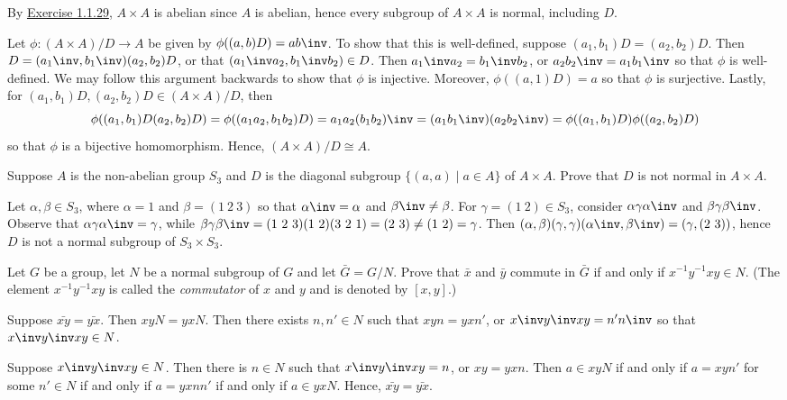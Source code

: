 \begin{sol}
    By \hyperref[ex1.1.29]{Exercise 1.1.29}, $A \times A$ is abelian since $A$ is abelian, hence every subgroup of $A \times A$ is normal, including $D$.

    Let $\phi : (A \times A)/D \to A$ be given by $\phi((a, b)D) = ab\inv$. To show that this is well-defined, suppose $(a_1, b_1)D = (a_2, b_2)D$. Then $D = (a_1\inv, b_1\inv)(a_2, b_2)D$, or that $(a_1\inv a_2, b_1\inv b_2) \in D$. Then $a_1\inv a_2 = b_1\inv b_2$, or $a_2b_2\inv = a_1b_1\inv$ so that $\phi$ is well-defined. We may follow this argument backwards to show that $\phi$ is injective. Moreover, $\phi((a, 1)D) = a$ so that $\phi$ is surjective. Lastly, for $(a_1, b_1)D, (a_2, b_2)D \in (A \times A)/D$, then
    \[\phi((a_1, b_1)D (a_2, b_2)D) = \phi((a_1a_2, b_1b_2)D) = a_1a_2(b_1b_2)\inv = (a_1b_1\inv)(a_2b_2\inv) = \phi((a_1, b_1)D)\phi((a_2, b_2)D)\]
    so that $\phi$ is a bijective homomorphism. Hence, $(A \times A)/D \cong A$.
\end{sol}

\begin{exercise}\label{ex3.1.39}
    Suppose $A$ is the non-abelian group $S_3$ and $D$ is the diagonal subgroup $\{(a,a) \mid a \in A\}$ of $A \times A$. Prove that $D$ is not normal in $A \times A$.
\end{exercise}

\begin{sol}
    Let $\alpha, \beta \in S_3$, where $\alpha = 1$ and $\beta = (1\ 2\ 3)$ so that $\alpha\inv = \alpha$ and $\beta\inv \neq \beta$. For $\gamma = (1\ 2) \in S_3$, consider $\alpha\gamma\alpha\inv$ and $\beta\gamma\beta\inv$. Observe that $\alpha\gamma\alpha\inv = \gamma$, while $\beta\gamma\beta\inv = (1\ 2\ 3)(1\ 2)(3\ 2\ 1) = (2\ 3) \neq (1\ 2) = \gamma$. Then $(\alpha, \beta)(\gamma, \gamma)(\alpha\inv, \beta\inv) = (\gamma, (2\ 3))$, hence $D$ is not a normal subgroup of $S_3 \times S_3$.
\end{sol}

\begin{specialexercise}\label{ex3.1.40}
    Let $G$ be a group, let $N$ be a normal subgroup of $G$ and let $\bar{G} = G/N$. Prove that $\bar{x}$ and $\bar{y}$ commute in $\bar{G}$ if and only if $x^{-1}y^{-1}xy \in N$. (The element $x^{-1}y^{-1}xy$ is called the \emph{commutator} of $x$ and $y$ and is denoted by $[x,y]$.)
\end{specialexercise}

\begin{sol}
    \rightimp Suppose $\bar{xy} = \bar{yx}$. Then $xyN = yxN$. Then there exists $n, n' \in N$ such that $xyn = yxn'$, or $x\inv y\inv xy = n'n\inv$ so that $x\inv y\inv xy \in N$.

    \noindent \leftimp Suppose $x\inv y\inv xy\in N$. Then there is $n \in N$ such that $x\inv y\inv xy = n$, or $xy = yxn$. Then $a \in xyN$ if and only if $a = xyn'$ for some $n' \in N$ if and only if $a = yxnn'$ if and only if $a \in yxN$. Hence, $\bar{xy} = \bar{yx}$.
\end{sol}

